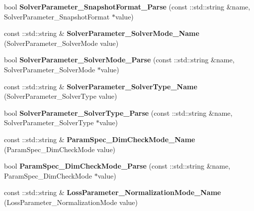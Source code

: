 \begin{DoxyCompactItemize}
\item 
\mbox{\label{namespacecaffe_acdbcd8f1b6b16b380251415167cd14fe}} 
bool {\bfseries Solver\+Parameter\+\_\+\+Snapshot\+Format\+\_\+\+Parse} (const \+::std\+::string \&name, Solver\+Parameter\+\_\+\+Snapshot\+Format $\ast$value)
\item 
\mbox{\label{namespacecaffe_aca8a0a649f770fe22629d8c363f9e5f3}} 
const \+::std\+::string \& {\bfseries Solver\+Parameter\+\_\+\+Solver\+Mode\+\_\+\+Name} (Solver\+Parameter\+\_\+\+Solver\+Mode value)
\item 
\mbox{\label{namespacecaffe_a21b173e6a484c8c89badc218604df365}} 
bool {\bfseries Solver\+Parameter\+\_\+\+Solver\+Mode\+\_\+\+Parse} (const \+::std\+::string \&name, Solver\+Parameter\+\_\+\+Solver\+Mode $\ast$value)
\item 
\mbox{\label{namespacecaffe_a397d11d6bdf05f20e2feb17e49515602}} 
const \+::std\+::string \& {\bfseries Solver\+Parameter\+\_\+\+Solver\+Type\+\_\+\+Name} (Solver\+Parameter\+\_\+\+Solver\+Type value)
\item 
\mbox{\label{namespacecaffe_a09dea9df039fa5333c73b78ae993755f}} 
bool {\bfseries Solver\+Parameter\+\_\+\+Solver\+Type\+\_\+\+Parse} (const \+::std\+::string \&name, Solver\+Parameter\+\_\+\+Solver\+Type $\ast$value)
\item 
\mbox{\label{namespacecaffe_afb2e4b253d9530d3ae1caec186d0b7c8}} 
const \+::std\+::string \& {\bfseries Param\+Spec\+\_\+\+Dim\+Check\+Mode\+\_\+\+Name} (Param\+Spec\+\_\+\+Dim\+Check\+Mode value)
\item 
\mbox{\label{namespacecaffe_a74c1548840657fb9398d7f2c9ab21bbc}} 
bool {\bfseries Param\+Spec\+\_\+\+Dim\+Check\+Mode\+\_\+\+Parse} (const \+::std\+::string \&name, Param\+Spec\+\_\+\+Dim\+Check\+Mode $\ast$value)
\item 
\mbox{\label{namespacecaffe_a9abbb4b7176e19dc1727da3b377498e9}} 
const \+::std\+::string \& {\bfseries Loss\+Parameter\+\_\+\+Normalization\+Mode\+\_\+\+Name} (Loss\+Parameter\+\_\+\+Normalization\+Mode value)
\item 
\mbox{\label{namespacecaffe_a0863bf4dbe52a78eee79ceae19bd5070}} 

\end{DoxyCompactItemize}

